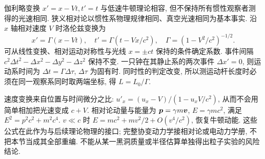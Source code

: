 伽利略变换 $x'=x-Vt,t'=t$ 与低速牛顿理论相容, 但不保持所有惯性观察者测得的光速相同. 狭义相对论以惯性系物理规律相同、真空光速相同为基本事实. 沿 $x$ 轴相对速度 $V$ 时洛伦兹变换为
\begin{equation}
x'=\Gamma(x-Vt),\quad t'=\Gamma(t-Vx/c^2),\quad
\Gamma=(1-V^2/c^2)^{-1/2}.
\end{equation}
可从线性变换、相对运动对称性与光线 $x=\pm ct$ 保持的条件确定系数. 事件间隔 $c^2\Delta t^2-\Delta x^2-\Delta y^2-\Delta z^2$ 保持不变. 一只钟在其静止系的两次事件 $\Delta x'=0$, 则运动系时间为 $\Delta t=\Gamma\Delta\tau$, $\Delta\tau$ 为固有时. 同时性的判定改变, 所以测运动杆长度时必须在同一观察系同时取两端坐标, 得 $L=L_0/\Gamma$.

速度变换来自位置与时间微分之比: $u'_x=(u_x-V)/(1-u_xV/c^2)$, 从而不会用简单相加把光速变成 $c+V$. 相对论动量与能量为 $\boldsymbol{p}=\gamma m\boldsymbol{v}$, $E=\gamma mc^2$, 满足 $E^2=p^2c^2+m^2c^4$. $v\ll c$ 时 $E=mc^2+mv^2/2+O(v^4/c^2)$, 恢复牛顿动能. 这些公式在此作为与后续理论物理的接口; 完整协变动力学接相对论或电动力学册, 不把本节当成其全部重编. 不能从某一黑洞质量或半径估算单独得出粒子实验的风险结论.
